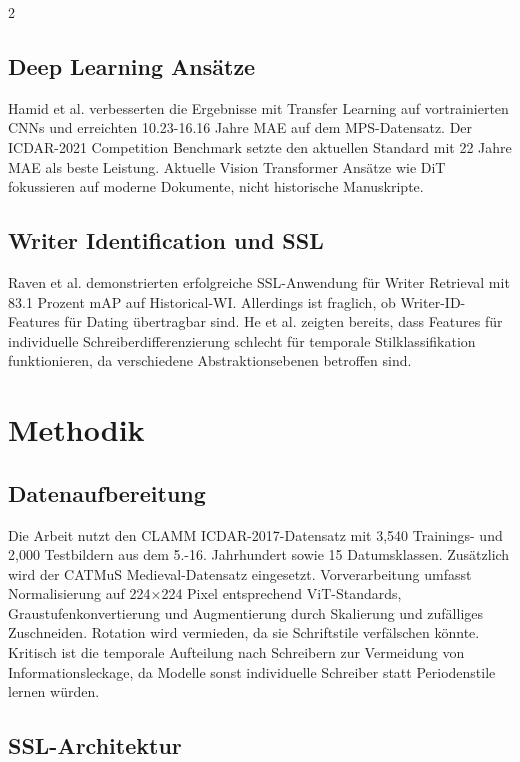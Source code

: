 \documentclass[12pt,a4paper]{article}
\begin{document}
\begin{multicols}{2}
\subsection{Deep Learning Ansätze}

Hamid et al. \cite{hamid2019deep} verbesserten die Ergebnisse mit Transfer Learning auf vortrainierten CNNs und erreichten 10.23-16.16 Jahre MAE auf dem MPS-Datensatz. Der ICDAR-2021 Competition Benchmark \cite{seuret2021icdar} setzte den aktuellen Standard mit 22 Jahre MAE als beste Leistung. Aktuelle Vision Transformer Ansätze wie DiT \cite{li2022dit} fokussieren auf moderne Dokumente, nicht historische Manuskripte.

\subsection{Writer Identification und SSL}

Raven et al. \cite{raven2024self} demonstrierten erfolgreiche SSL-Anwendung für Writer Retrieval mit 83.1 Prozent mAP auf Historical-WI. Allerdings ist fraglich, ob Writer-ID-Features für Dating übertragbar sind. He et al. \cite{he2016image} zeigten bereits, dass Features für individuelle Schreiberdifferenzierung schlecht für temporale Stilklassifikation funktionieren, da verschiedene Abstraktionsebenen betroffen sind.

\section{Methodik}

\subsection{Datenaufbereitung}

Die Arbeit nutzt den CLAMM ICDAR-2017-Datensatz \cite{cloppet2017icdar2017} mit 3,540 Trainings- und 2,000 Testbildern aus dem 5.-16. Jahrhundert sowie 15 Datumsklassen. Zusätzlich wird der CATMuS Medieval-Datensatz \cite{clerice2024catmus} eingesetzt. Vorverarbeitung umfasst Normalisierung auf 224×224 Pixel entsprechend ViT-Standards, Graustufenkonvertierung und Augmentierung durch Skalierung und zufälliges Zuschneiden. Rotation wird vermieden, da sie Schriftstile verfälschen könnte. Kritisch ist die temporale Aufteilung nach Schreibern zur Vermeidung von Informationsleckage, da Modelle sonst individuelle Schreiber statt Periodenstile lernen würden.

\subsection{SSL-Architektur}


\end{multicols}
\end{document}
